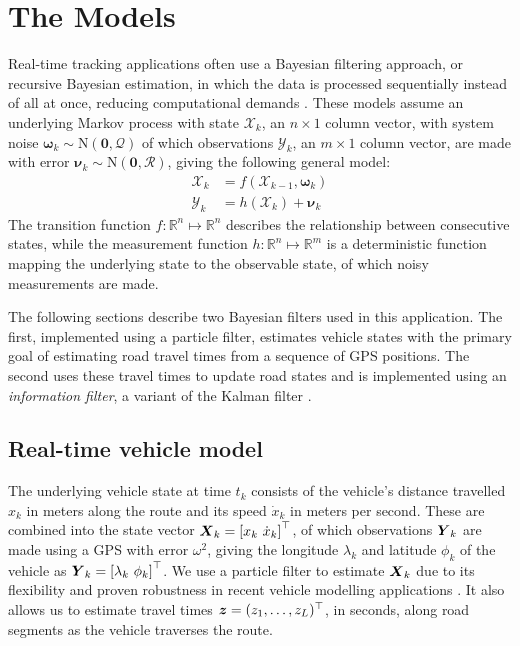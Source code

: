 \section{The Models}
\label{sec:models}

Real-time tracking applications often use
a Bayesian filtering approach,
or recursive Bayesian estimation,
in which the data is processed sequentially instead of all at once,
reducing computational demands
\citep{Anderson_2012}.
These models assume an underlying Markov process with state $\boldsymbol{\mathcal{X}}_k$,
an $n\times1$ column vector,
with system noise $\boldsymbol{\omega}_k\sim\mathrm{N}(\boldsymbol{0},\mathcal{Q})$ 
of which observations $\boldsymbol{\mathcal{Y}}_k$,
an $m\times1$ column vector, are made
with error $\boldsymbol{\nu}_k\sim\mathrm{N}(\boldsymbol{0},\mathcal{R})$,
giving the following general model:
\begin{equation}
\label{eq:rbe_model}
\begin{split}
\boldsymbol{\mathcal{X}}_k &= f(\boldsymbol{\mathcal{X}}_{k-1}, \boldsymbol{\omega}_k) \\
\boldsymbol{\mathcal{Y}}_k &= h(\boldsymbol{\mathcal{X}}_k) + \boldsymbol{\nu}_k
\end{split}
\end{equation}
The transition function $f:\mathbb{R}^n\mapsto\mathbb{R}^n$ 
describes the relationship between consecutive states,
while the measurement function $h:\mathbb{R}^n\mapsto\mathbb{R}^m$ is a deterministic function
mapping the underlying state to the observable state,
of which noisy measurements are made.



The following sections describe two Bayesian filters used in this application.
The first, implemented using a particle filter, estimates vehicle states
with the primary goal of estimating road travel times from a sequence of GPS positions.
The second uses these travel times to update road states 
and is implemented using an \emph{information filter},
a variant of the Kalman filter \citep{Anderson_2012}.



\subsection{Real-time vehicle model}
\label{sec:pf}

The underlying vehicle state at time $t_k$ consists of
the vehicle's distance travelled $x_k$ in meters along the route and
its speed $\dot x_k$ in meters per second.
These are combined into the state vector
$\mbox{$\boldsymbol{X}$}_k = \left[x_k\ \dot x_k\right]^\top$,
of which observations $\mbox{$\boldsymbol{Y}$}_k$ are made using a GPS
with error $\omega^2$,
giving the longitude $\lambda_k$ and latitude $\phi_k$ of the vehicle
as $\bY_k = \left[\lambda_k\ \phi_k \right]^\top$.
We use a particle filter to estimate $\mbox{$\boldsymbol{X}$}_k$
due to its flexibility and proven robustness
in recent vehicle modelling applications \citep{Ulmke_2006,Hans_2015}.
It also allows us to estimate travel times
$\boldsymbol{z} = (z_1,\ldots,z_L)^\top$, in seconds, along road segments
as the vehicle traverses the route.


